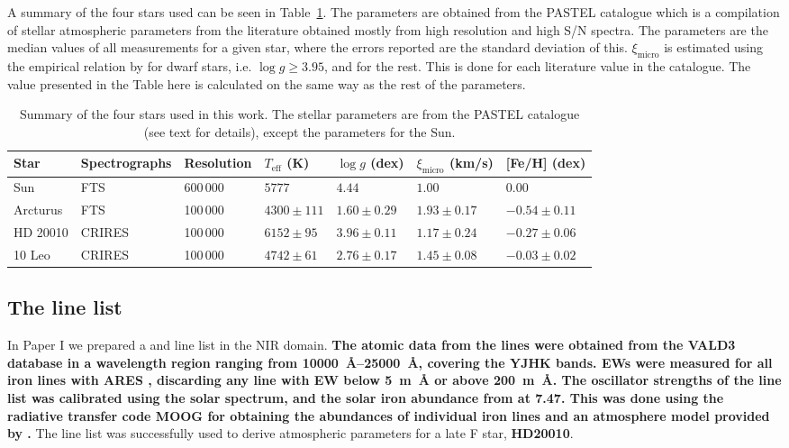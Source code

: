 \documentclass{aa}
\begin{document}
A summary of the four stars used can be seen in Table~\ref{tab:stars}. The
parameters are obtained from the PASTEL catalogue \citep{Soubiran2016} which is
a compilation of stellar atmospheric parameters from the literature obtained
mostly from high resolution and high S/N spectra. The parameters are the median
values of all measurements for a given star, where the errors reported are the
standard deviation of this. $\xi_\mathrm{micro}$ is estimated using the
empirical relation by \citet{Tsantaki2013} for dwarf stars, i.e. $\log
g\ge3.95$, and \citet{Adibekyan2015} for the rest. This is done for each
literature value in the catalogue. The value presented in the Table here is
calculated on the same way as the rest of the parameters.
\begin{table}[htb!]
    \caption{Summary of the four stars used in this work. The stellar parameters
             are from the PASTEL catalogue \citep{Soubiran2016} (see text for
             details), except the parameters for the Sun.}
    \label{tab:stars}
    \centering
    \begin{tabular}{lllllll}
      \hline\hline
        Star        & Spectrographs  & Resolution  & $T_\mathrm{eff}$ (K) &  $\log g$ (dex)  &   $\xi_\mathrm{micro}$ (km/s)   & [Fe/H] (dex)      \\
      \hline
        Sun         & FTS            & 600\,000    & $5777$               &  $4.44$          &    $1.00$                       & $ 0.00$          \\
        Arcturus    & FTS            & 100\,000    & $4300 \pm 111$       &  $1.60 \pm 0.29$ &    $1.93 \pm 0.17$              & $-0.54 \pm 0.11$ \\
        HD 20010    & CRIRES         & 100\,000    & $6152 \pm  95$       &  $3.96 \pm 0.11$ &    $1.17 \pm 0.24$              & $-0.27 \pm 0.06$ \\
        10 Leo      & CRIRES         & 100\,000    & $4742 \pm  61$       &  $2.76 \pm 0.17$ &    $1.45 \pm 0.08$              & $-0.03 \pm 0.02$ \\
      \hline
    \end{tabular}
\end{table}

\subsection{The line list}

In Paper I we prepared a  and  line list in the NIR
domain. {\bf The atomic data from the lines were obtained from the VALD3
database \citep{VALD1,VALD2} in a wavelength region ranging from
\SIrange{10000}{25000}{\AA}, covering the YJHK bands. EWs were measured for all
iron lines with ARES \citep{Sousa2015a}, discarding any line with EW below
\SI{5}{m\AA} or above \SI{200}{m\AA}. The oscillator strengths of the line list
was calibrated using the solar spectrum, and the solar iron abundance from
\citet{Gonzalez2000} at 7.47. This was done using the radiative transfer code
MOOG \citep{Sneden1973} for obtaining the abundances of individual iron lines
and an atmosphere model provided by \citet{Kurucz1993}.} The line list was
successfully used to derive atmospheric parameters for a late F star, {\bf
HD20010}.
\end{document}
